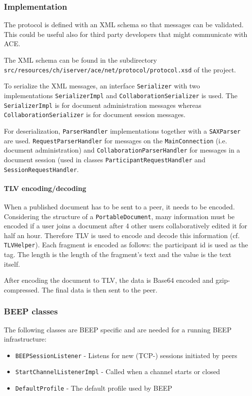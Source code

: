 \subsubsection{Implementation}
The protocol is defined with an XML schema so that messages can be validated. This could be useful also for third party developers that might communicate with ACE.

The XML schema can be found in the subdirectory \texttt{src/resources/ch/iserver/ace/net/protocol/protocol.xsd} of the project.

To serialize the XML messages, an interface \texttt{Serializer} with two implementations \texttt{SerializerImpl} and \texttt{CollaborationSerializer} is used. The \texttt{SerializerImpl} is for document administration messages whereas \texttt{CollaborationSerializer} is for document session messages.

For deserialization, \texttt{ParserHandler} implementations together with a \texttt{SAXParser} are used. \texttt{RequestParserHandler} for messages on the \texttt{MainConnection} (i.e. document administration) and \texttt{CollaborationParserHandler} for messages in a document session (used in classes \texttt{ParticipantRequestHandler} and \texttt{SessionRequestHandler}.


\paragraph{TLV encoding/decoding}
When a published document has to be sent to a peer, it needs to be encoded. Considering the structure of a \texttt{PortableDocument}, many information must be encoded if a user joins a document after 4 other users collaboratively edited it for half an hour. Therefore TLV is used to encode and decode this information (cf. \texttt{TLVHelper}). Each fragment is encoded as follows: the participant id is used as the tag. The length is the length of the fragment's text and the value is the text itself. 

After encoding the document to TLV, the data is Base64 encoded and gzip-compressed. The final data is then sent to the peer.


\subsubsection{BEEP classes}
The following classes are BEEP specific and are needed for a running BEEP infrastructure:

\begin{itemize}
\item \texttt{BEEPSessionListener}		- 	Listens for new (TCP-) sessions initiated by peers
\item \texttt{StartChannelListenerImpl} 	-	Called when a channel starts or closed 
\item \texttt{DefaultProfile}				-	The default profile used by BEEP
\end{itemize}


